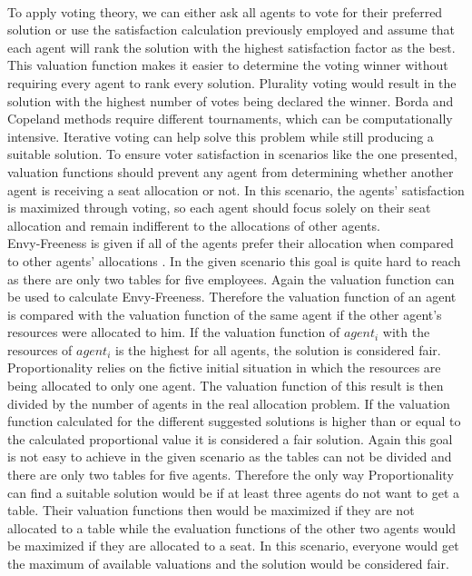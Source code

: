 \documentclass[german, a4paper, 11pt, oneside]{scrbook}
\begin{document}
\\To apply voting theory, we can either ask all agents to vote for their preferred solution or use the satisfaction calculation previously employed and assume that each agent will rank the solution with the highest satisfaction factor as the best. This valuation function makes it easier to determine the voting winner without requiring every agent to rank every solution. Plurality voting would result in the solution with the highest number of votes being declared the winner. Borda and Copeland methods require different tournaments, which can be computationally intensive. Iterative voting can help solve this problem while still producing a suitable solution. To ensure voter satisfaction in scenarios like the one presented, valuation functions should prevent any agent from determining whether another agent is receiving a seat allocation or not. In this scenario, the agents' satisfaction is maximized through voting, so each agent should focus solely on their seat allocation and remain indifferent to the allocations of other agents.
\\Envy-Freeness is given if all of the agents prefer their allocation when compared to other agents' allocations \cite{Brandt}. In the given scenario this goal is quite hard to reach as there are only two tables for five employees. Again the valuation function can be used to calculate Envy-Freeness. Therefore the valuation function of an agent is compared with the valuation function of the same agent if the other agent's resources were allocated to him. If the valuation function of $agent_i$ with the resources of $agent_i$ is the highest for all agents, the solution is considered fair. \cite{Brandt}
\\Proportionality relies on the fictive initial situation in which the resources are being allocated to only one agent. The valuation function of this result is then divided by the number of agents in the real allocation problem. If the valuation function calculated for the different suggested solutions is higher than or equal to the calculated proportional value it is considered a fair solution. Again this goal is not easy to achieve in the given scenario as the tables can not be divided and there are only two tables for five agents. Therefore the only way Proportionality can find a suitable solution would be if at least three agents do not want to get a table. Their valuation functions then would be maximized if they are not allocated to a table while the evaluation functions of the other two agents would be maximized if they are allocated to a seat. In this scenario, everyone would get the maximum of available valuations and the solution would be considered fair.
\end{document}
